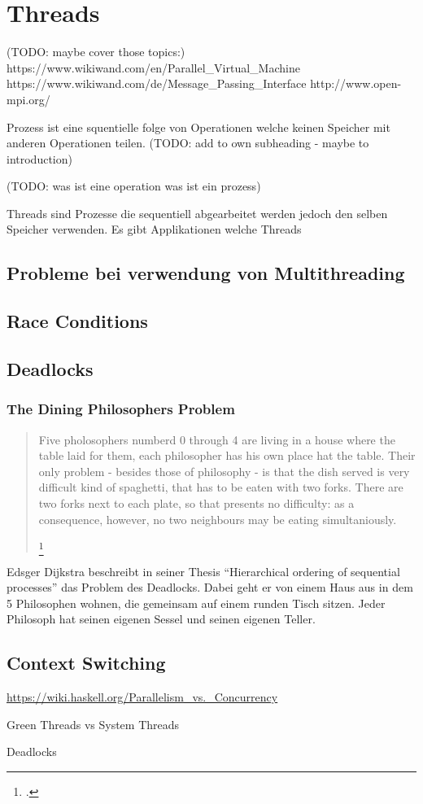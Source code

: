 \section{Threads}
\label{section: Threads}


(TODO: maybe cover those topics:)
https://www.wikiwand.com/en/Parallel_Virtual_Machine
https://www.wikiwand.com/de/Message_Passing_Interface
http://www.open-mpi.org/



Prozess ist eine squentielle folge von Operationen welche keinen Speicher mit anderen Operationen teilen. (TODO: add to own subheading - maybe to introduction)


(TODO: was ist eine operation was ist ein prozess)

Threads sind Prozesse die sequentiell abgearbeitet werden jedoch den selben Speicher verwenden. \cite[p. 2]{Lee06} Es gibt Applikationen welche Threads








\subsection{Probleme bei verwendung von Multithreading}

\subsection{Race Conditions}

\subsection{Deadlocks}

\subsubsection{The Dining Philosophers Problem}

\blockquote[{\footcite[S. 21]{dij71}}]{
	Five pholosophers numberd 0 through 4 are living in a house where the table laid for them, each philosopher has his own place hat the table. Their only problem - besides those of philosophy - is that the dish served is very difficult kind of spaghetti, that has to be eaten with two forks. There are two forks next to each plate, so that presents no difficulty: as a consequence, however, no two neighbours may be eating simultaniously.
} 


Edsger Dijkstra beschreibt in seiner Thesis ``Hierarchical ordering of sequential processes'' das Problem des Deadlocks. Dabei geht er von einem Haus aus in dem 5 Philosophen wohnen, die gemeinsam auf einem runden Tisch sitzen. Jeder Philosoph hat seinen eigenen Sessel und seinen eigenen Teller. 



\cite[p. 21]{dij71}




\subsection{Context Switching}



\url{https://wiki.haskell.org/Parallelism_vs._Concurrency}

Green Threads vs System Threads

Deadlocks